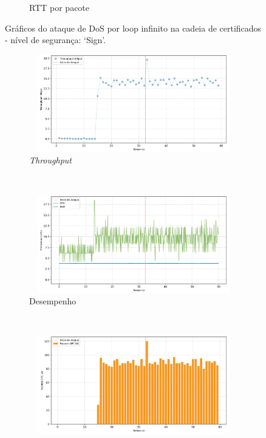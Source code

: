 \begin{apendicesenv}
\begin{figure}[htbp!]
\begin{subfigure}[t]{0.5\textwidth}
        \caption{RTT por pacote}
    \end{subfigure}%
    \label{fig:1-dos_certificate_inf_chain_loop}
    \caption{Gráficos do ataque de DoS por loop infinito na cadeia de certificados - nível de segurança: `Sign'.}
\end{figure}

\begin{figure}[htbp!]
    \centering
    \begin{subfigure}[t]{0.5\textwidth}
        \centering
        \includegraphics[width=1\textwidth, height=120pt]{USPSC-img/output/cropped/2-dos_certificate_inf_chain_loop-tput.png}
        \caption{\textit{Throughput}}
    \end{subfigure}%
    ~ 
    \begin{subfigure}[t]{0.5\textwidth}
        \centering
        \includegraphics[width=1\textwidth, height=120pt]{USPSC-img/output/cropped/2-dos_certificate_inf_chain_loop-perf.png}
        \caption{Desempenho}
    \end{subfigure}%
    \\
    \begin{subfigure}[t]{0.5\textwidth}
        \centering
        \includegraphics[width=1\textwidth, height=120pt]{USPSC-img/output/cropped/2-dos_certificate_inf_chain_loop-pack.png}

\end{subfigure}
\end{figure}
\end{apendicesenv}
